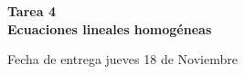 \documentclass[12pt]{exam}
\begin{document}
\centering


\Large 
\textbf{\huge Tarea 4\\ \large Ecuaciones lineales homogéneas}

\small
Fecha de entrega jueves 18 de Noviembre
\vskip10pt

\normalsize

\pointformat{\bfseries\boldmath(\thepoints)}
\vskip10pt
\end{document}
